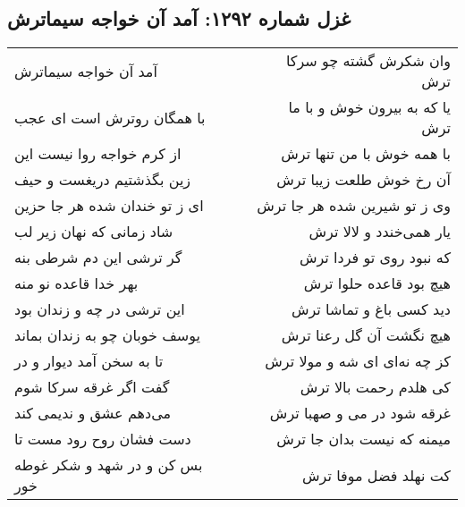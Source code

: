 \begin{center}
\section*{غزل شماره ۱۲۹۲: آمد آن خواجه سیماترش}
\label{sec:1292}
\begin{longtable}{l p{0.5cm} r}
آمد آن خواجه سیماترش
&&
وان شکرش گشته چو سرکا ترش
\\
با همگان روترش است ای عجب
&&
یا که به بیرون خوش و با ما ترش
\\
از کرم خواجه روا نیست این
&&
با همه خوش با من تنها ترش
\\
زین بگذشتیم دریغست و حیف
&&
آن رخ خوش طلعت زیبا ترش
\\
ای ز تو خندان شده هر جا حزین
&&
وی ز تو شیرین شده هر جا ترش
\\
شاد زمانی که نهان زیر لب
&&
یار همی‌خندد و لالا ترش
\\
گر ترشی این دم شرطی بنه
&&
که نبود روی تو فردا ترش
\\
بهر خدا قاعده نو منه
&&
هیچ بود قاعده حلوا ترش
\\
این ترشی در چه و زندان بود
&&
دید کسی باغ و تماشا ترش
\\
یوسف خوبان چو به زندان بماند
&&
هیچ نگشت آن گل رعنا ترش
\\
تا به سخن آمد دیوار و در
&&
کز چه نه‌ای ای شه و مولا ترش
\\
گفت اگر غرقه سرکا شوم
&&
کی هلدم رحمت بالا ترش
\\
می‌دهم عشق و ندیمی کند
&&
غرقه شود در می و صهبا ترش
\\
دست فشان روح رود مست تا
&&
میمنه که نیست بدان جا ترش
\\
بس کن و در شهد و شکر غوطه خور
&&
کت نهلد فضل موفا ترش
\\
\end{longtable}
\end{center}
